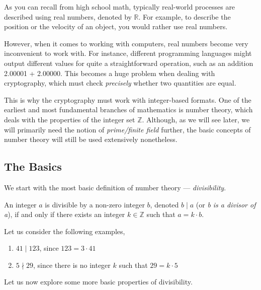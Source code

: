 \documentclass[../lecture-notes-148x210.tex]{subfiles}
\begin{document}
As you can recall from high school math, typically real-world processes are described
using real numbers, denoted by $\mathbb{R}$. For example, to describe the position or 
the velocity of an object, you would rather use real numbers. 

However, when it comes to working with computers, real numbers become very inconvenient 
to work with. For instance, different programming languages might output different values 
for quite a straightforward operation, such as an addition \textsf{2.00001 + 2.00000}. This becomes a huge problem 
when dealing with cryptography, which must check \textit{precisely} whether two quantities 
are equal.

This is why the cryptography must work with integer-based formats. One of the earliest and 
most fundamental branches of mathematics is number theory, which deals with the properties 
of the integer set $\mathbb{Z}$. Although, as we will see later, we will primarily need 
the notion of \emph{prime/finite field} further, the basic concepts of number theory will 
still be used extensively nonetheless.

\subsection{The Basics}

We start with the most basic definition of number theory --- \emph{divisibility}.

\begin{definition}
    An integer $a$ is divisible by a non-zero integer $b$, denoted $b \mid a$ (or \emph{b is a divisor of a}), if and only if there exists an integer $k \in \mathbb{Z}$ such that $a = k \cdot b$.
\end{definition}

\begin{example} 
    \label{example:divisibility_1}
    Let us consider the following examples,
    \begin{enumerate}
        \item $41 \mid 123$, since $123 = 3 \cdot 41$
        \item $5 \nmid 29$, since there is no integer $k$ such that $29 = k \cdot 5$
    \end{enumerate}
\end{example}

Let us now explore some more basic properties of divisibility. 
\end{document}

